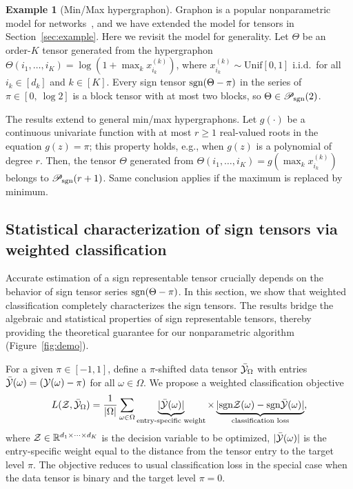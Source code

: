\documentclass{article}
\theoremstyle{plain}
\theoremstyle{definition}
\newtheorem{example}{Example}
\newcommand*{\KeepStyleUnderBrace}[1]{%
  \mathop{%
    \mathchoice
    {\underbrace{\displaystyle#1}}%
    {\underbrace{\textstyle#1}}%
    {\underbrace{\scriptstyle#1}}%
    {\underbrace{\scriptscriptstyle#1}}%
  }\limits
}
\def\sign{\textup{sgn}}
\def\caliP{\mathscr{P}_{\textup{sgn}}}
\begin{document}
\begin{example}[Min/Max hypergraphon] Graphon is a popular nonparametric model for networks~\cite{chan2014consistent,xu2018rates}, and we have extended the model for tensors in Section~\ref{sec:example}. Here we revisit the model for generality. Let $\Theta$ be an order-$K$ tensor generated from the hypergraphon $\Theta(i_1,\ldots,i_K)=\log(1+\max_kx^{(k)}_{i_k})$, where $x^{(k)}_{i_k}\sim \text{Unif}[0,1]$ i.i.d.\ for all $i_k\in[d_k]$ and $k\in[K]$. Every sign tensor $\sign(\Theta-\pi)$ in the series of $\pi\in[0,\ \log 2]$ is a block tensor with at most two blocks, so $\Theta \in \caliP(2)$. 

The results extend to general min/max hypergraphons. Let $g(\cdot)$ be a continuous univariate function with at most $r\geq 1$ real-valued roots in the equation $g(z)=\pi$; this property holds, e.g., when $g(z)$ is a polynomial of degree $r$. Then, the tensor $\Theta$ generated from $\Theta(i_1,\ldots,i_K)=g(\max_kx^{(k)}_{i_k})$ belongs to $\caliP(r+1)$. Same conclusion applies if the maximum is replaced by minimum.
\end{example}

\subsection{Statistical characterization of sign tensors via weighted classification}

Accurate estimation of a sign representable tensor crucially depends on the behavior of sign tensor series $\sign(\Theta-\pi)$. In this section, we show that weighted classification completely characterizes the sign tensors. The results bridge the algebraic and statistical properties of sign representable tensors, thereby providing the theoretical guarantee for our nonparametric algorithm (Figure~\ref{fig:demo}).
 
For a given $\pi \in [-1,1]$, define a $\pi$-shifted data tensor $\bar {\mathcal{Y}}_\Omega$ with entries $\bar {\mathcal{Y}}(\omega) = (\mathcal{Y}(\omega)-\pi)$ for all $\omega\in \Omega$. We propose a weighted classification objective
\begin{equation}\label{eq:sample}
L(\tZ, \bar \tY_\Omega)= {1\over |\Omega|}\sum_{\omega \in \Omega}\KeepStyleUnderBrace{|\bar \tY(\omega)|}_{\text{entry-specific weight}} \times \KeepStyleUnderBrace{| \sign \tZ(\omega)-\sign \bar \tY(\omega)|}_{\text{classification loss}},
\end{equation}
where $\mathcal{Z}\in\mathbb{R}^{d_1\times \cdots \times d_K}$ is the decision variable to be optimized, $|\bar {\mathcal{Y}}(\omega)|$ is the entry-specific weight equal to the distance from the tensor entry to the target level $\pi$. The objective reduces to usual classification loss in the special case when the data tensor is binary and the target level $\pi=0$.
\end{document}
